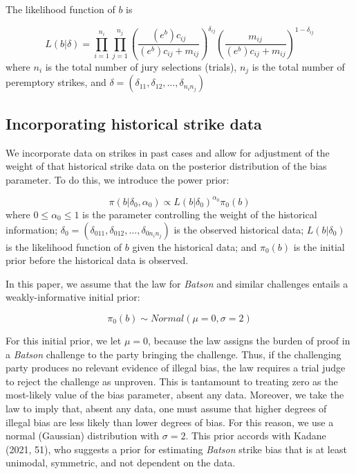 \documentclass[12pt]{article}
\begin{document}
The likelihood function of \(b\) is

\begin{equation}  
L(b|\delta) = \prod_{i=1}^{n_i} \prod_{j=1}^{n_j}\left(\frac{(e^b)c_{ij}}{(e^b)c_{ij}+m_{ij}}\right)^{\delta_{ij}} \left(\frac{m_{ij}}{(e^b)c_{ij}+m_{ij}}\right)^{1-\delta_{ij}}
\label{eq:model3}
\end{equation} where \(n_{i}\) is the total number of jury selections (trials), \(n_j\) is the total number of peremptory strikes, and \(\delta=(\delta_{11},\delta_{12},\dots,\delta_{{n_i}{n_j}})\)

\hypertarget{incorporating-historical-strike-data}{%
\subsection{Incorporating historical strike data}\label{incorporating-historical-strike-data}}

We incorporate data on strikes in past cases and allow for adjustment of the weight of that historical strike data on the posterior distribution of the bias parameter. To do this, we introduce the power prior:

\begin{equation}  
\pi(b|\delta_0,\alpha_0) \propto L(b|\delta_0)^{\alpha_0}\pi_0(b)
\label{eq:powerprior}
\end{equation} where \(0 \le \alpha_0 \le 1\) is the parameter controlling the weight of the historical information; \(\delta_0=(\delta_{011},\delta_{012},\dots,\delta_{0{n_i}{n_j}})\) is the observed historical data; \(L(b|\delta_0)\) is the likelihood function of \(b\) given the historical data; and \(\pi_0(b)\) is the initial prior before the historical data is observed.

In this paper, we assume that the law for \emph{Batson} and similar challenges entails a weakly-informative initial prior:

\begin{equation}  
\pi_0(b) \sim Normal(\mu = 0, \sigma = 2)
\label{eq:initialprior}
\end{equation}

For this initial prior, we let \(\mu = 0\), because the law assigns the burden of proof in a \emph{Batson} challenge to the party bringing the challenge. Thus, if the challenging party produces no relevant evidence of illegal bias, the law requires a trial judge to reject the challenge as unproven. This is tantamount to treating zero as the most-likely value of the bias parameter, absent any data. Moreover, we take the law to imply that, absent any data, one must assume that higher degrees of illegal bias are less likely than lower degrees of bias. For this reason, we use a normal (Gaussian) distribution with \(\sigma = 2\). This prior accords with Kadane (2021, 51), who suggests a prior for estimating \emph{Batson} strike bias that is at least unimodal, symmetric, and not dependent on the data.
\end{document}

